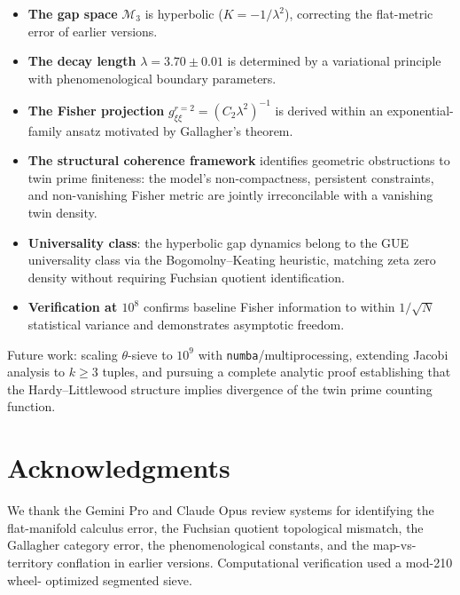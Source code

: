 \documentclass[12pt]{article}
\begin{document}
\begin{itemize}
  \item \textbf{The gap space} $\mathcal{M}_3$ is hyperbolic ($K = -1/\lambda^2$),
    correcting the flat-metric error of earlier versions.
  \item \textbf{The decay length} $\lambda = 3.70 \pm 0.01$ is determined by a
    variational principle with phenomenological boundary parameters.
  \item \textbf{The Fisher projection} $g_{\xi\xi}^{r=2} = (C_2\lambda^2)^{-1}$
    is derived within an exponential-family ansatz motivated by Gallagher's theorem.
  \item \textbf{The structural coherence framework} identifies geometric obstructions
    to twin prime finiteness: the model's non-compactness, persistent constraints,
    and non-vanishing Fisher metric are jointly irreconcilable with a vanishing
    twin density.
  \item \textbf{Universality class}: the hyperbolic gap dynamics belong to the GUE
    universality class via the Bogomolny--Keating heuristic, matching zeta zero
    density without requiring Fuchsian quotient identification.
  \item \textbf{Verification at $10^8$} confirms baseline Fisher information to
    within $1/\sqrt{N}$ statistical variance and demonstrates asymptotic freedom.
\end{itemize}

Future work: scaling $\theta$-sieve to $10^9$ with \texttt{numba}/multiprocessing,
extending Jacobi analysis to $k \geq 3$ tuples, and pursuing a complete analytic
proof establishing that the Hardy--Littlewood structure implies divergence of the
twin prime counting function.

\section*{Acknowledgments}

We thank the Gemini Pro and Claude Opus review systems for identifying the
flat-manifold calculus error, the Fuchsian quotient topological mismatch, the
Gallagher category error, the phenomenological constants, and the map-vs-territory
conflation in earlier versions. Computational verification used a mod-210 wheel-
optimized segmented sieve.
\end{document}
